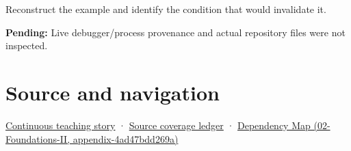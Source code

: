 Reconstruct the example and identify the condition that would invalidate it.

\textbf{Pending:} Live debugger/process provenance and actual repository files were not inspected.

\section{Source and navigation}\label{appendix-230b59c0676b-source-and-navigation}

\href{Continuous\%20Notes/Computing\%20Foundations\%20-\%20From\%20Bits\%20to\%20C++\%20and\%20Systems\%20APIs\#Bytes\%20become\%20a\%20durable\%20agreement}{Continuous teaching story} · \hyperref[appendix-fd090d982a15]{Source coverage ledger} · \href{../02-Foundations-II/main.pdf\#nameddest=appendix-4ad47bdd269a}{Dependency Map (02-Foundations-II, appendix-4ad47bdd269a)}
